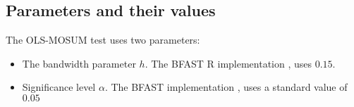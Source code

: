 \documentclass[main.tex]{subfiles}
\begin{document}
\subsection{Parameters and their values}
\label{subsec:mosum_parameters}
The OLS-MOSUM test uses two parameters:
\begin{itemize}
\item The bandwidth parameter $h$. The BFAST R implementation
  \cite{bfast-github}, uses $0.15$.
\item Significance level $\alpha$. The BFAST implementation
  \cite{bfast-github}, uses a standard value of $0.05$
\end{itemize}


\biblio
\end{document}
